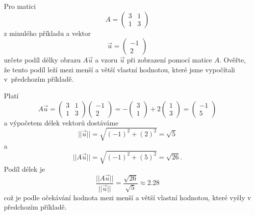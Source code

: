  Pro matici $$A=
 \begin{pmatrix}
   3&1\\1&3
 \end{pmatrix}
$$ z minulého příkladu a vektor $$\vec u=
\begin{pmatrix}
  -1\\2
\end{pmatrix}
$$
určete podíl délky obrazu $A\vec u$ a vzoru $\vec u$ při zobrazení pomocí matice $A$. Ověřte, že tento podíl leží mezi menší a větší vlastní hodnotou, které jsme vypočítali v~předchozím příkladě.

\reseni

Platí
$$A\vec u=
\begin{pmatrix}
  3&1\\1&3
\end{pmatrix}
\begin{pmatrix}
  -1\\2
\end{pmatrix}
=
-
\begin{pmatrix}
  3\\1
\end{pmatrix}
+2
\begin{pmatrix}
  1\\3
\end{pmatrix}
=
\begin{pmatrix}
  -1\\5
\end{pmatrix}
$$
a výpočetem délek vektorů
dostáváme
$$||\vec u||=\sqrt{(-1)^2+(2)^2}=\sqrt 5$$
a 
$$||A\vec u||=\sqrt{(-1)^2+(5)^2}=\sqrt {26}.$$
Podíl délek je
$$\frac{||A\vec u||}{||\vec u||}=\frac{\sqrt {26}}{\sqrt 5}\approx 2.28$$
což je podle očekávání hodnota mezi menší a větší vlastní hodnotou, které vyšly v předchozím příkladě.

\konec
 




